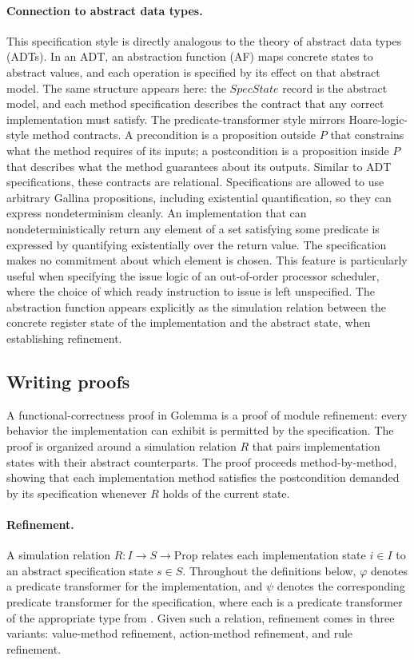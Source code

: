 \documentclass[fontset=fira-newtxsf]{mitthesis}
\theoremstyle{definition}
\theoremstyle{plain}
\begin{document}
\paragraph{Connection to abstract data types.}
This specification style is directly analogous to the theory of abstract data types (ADTs).
In an ADT, an abstraction function (AF) maps concrete states to abstract values, and each operation is specified by its effect on that abstract model.
The same structure appears here: the $\mathit{SpecState}$ record is the abstract model, and each method specification describes the contract that any correct implementation must satisfy.
The predicate-transformer style mirrors Hoare-logic-style method contracts.
A precondition is a proposition outside $P$ that constrains what the method requires of its inputs; a postcondition is a proposition inside $P$ that describes what the method guarantees about its outputs.
Similar to ADT specifications, these contracts are relational. Specifications are allowed to use arbitrary Gallina propositions, including existential quantification, so they can express nondeterminism cleanly.
An implementation that can nondeterministically return any element of a set satisfying some predicate is expressed by quantifying existentially over the return value. The specification makes no commitment about which element is chosen.
This feature is particularly useful when specifying the issue logic of an out-of-order processor scheduler, where the choice of which ready instruction to issue is left unspecified.
The abstraction function appears explicitly as the simulation relation between the concrete register state of the implementation and the abstract state, when establishing refinement.

\subsection{Writing proofs} \label{sec:Golemma-spec-refinement}

A functional-correctness proof in Golemma is a proof of module refinement: every behavior the implementation can exhibit is permitted by the specification.
The proof is organized around a simulation relation $R$ that pairs implementation states with their abstract counterparts. The proof proceeds method-by-method, showing that each implementation method satisfies the postcondition demanded by its specification whenever $R$ holds of the current state.

\paragraph{Refinement.}
A simulation relation $R : I \to S \to \text{Prop}$ relates each implementation state $i \in I$ to an abstract specification state $s \in S$.
Throughout the definitions below, $\varphi$ denotes a predicate transformer for the implementation, and $\psi$ denotes the corresponding predicate transformer for the specification, where each is a predicate transformer of the appropriate type from .
Given such a relation, refinement comes in three variants: value-method refinement, action-method refinement, and rule refinement.
\end{document}
